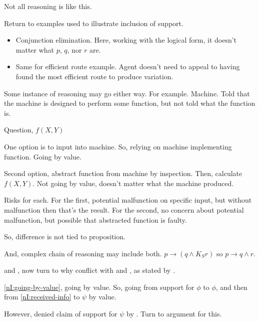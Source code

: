 \begin{note}
  Not all reasoning is like this.

  Return to examples used to illustrate inclusion of support.
  \begin{itemize}
  \item Conjunction elimination.
    Here, working with the logical form, it doesn't matter what \(p\), \(q\), nor \(r\) are.
  \item Same for efficient route example.
    Agent doesn't need to appeal to having found the most efficient route to produce variation.
  \end{itemize}

  Some instance of reasoning may go either way.
  For example.
  Machine.
  Told that the machine is designed to perform some function, but not told what the function is.

  Question, \(f(X,Y)\)

  One option is to input into machine.
  So, relying on machine implementing function.
  Going by value.

  Second option, abstract function from machine by inspection.
  Then, calculate \(f(X,Y)\).
  Not going by value, doesn't matter what the machine produced.

  Risks for each.
  For the first, potential malfunction on specific input, but without malfunction then that's the result.
  For the second, no concern about potential malfunction, but possible that abstracted function is faulty.

  So, difference is not tied to proposition.

  And, complex chain of reasoning may include both.
  \(p \rightarrow (q \land K_{S}r)\) so \(p \rightarrow q \land r\).
\end{note}

\begin{note}[Review of \nI{}]
  \incl{} and \RBV{}, now turn to why conflict with \incl{} and \RBV{}, as stated by \nI{}.

  \ref{nI:going-by-value}, going by value.
  So, going from support for \(\phi\) to \(\phi\), and then from \ref{nI:received-info} to \(\psi\) by value.

  However, denied claim of support for \(\psi\) by \incl{}.
  Turn to argument for this.
\end{note}

